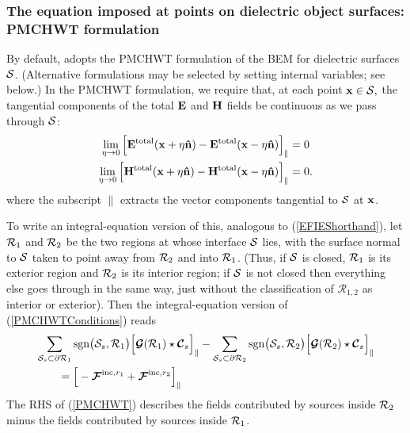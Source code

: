\subsubsection{The equation imposed at points on 
               dielectric object surfaces: PMCHWT formulation}

By default, \lss adopts the PMCHWT formulation of the 
BEM for dielectric surfaces $\mathcal{S}$. 
(Alternative formulations may be selected by setting
internal \lss variables; see below.) In the PMCHWT formulation, 
we require that, at each point $\mathbf{x}\in\mathcal{S},$ the 
tangential components of the total $\mathbf{E}$ and $\mathbf{H}$ 
fields be continuous as we pass through $\mathcal{S}$:
\begin{subequations}
\begin{align}
 \lim_{\eta \to 0}
 \Big[ \mathbf{E}^{\hbox{\scriptsize{total}}}(\mathbf{x} + \eta\mathbf{\hat n})
      -\mathbf{E}^{\hbox{\scriptsize{total}}}(\mathbf{x} - \eta\mathbf{\hat n})
 \Big]_{\parallel} 
&= 0 
\\
 \lim_{\eta \to 0}
 \Big[ \mathbf{H}^{\hbox{\scriptsize{total}}}(\mathbf{x} + \eta\mathbf{\hat n})
      -\mathbf{H}^{\hbox{\scriptsize{total}}}(\mathbf{x} - \eta\mathbf{\hat n})
 \Big]_{\parallel} 
&= 0.
\label{PMCHWTConditions}
\end{align}
\end{subequations}
where the subscript ${\parallel}$ extracts the 
vector components tangential to $\mathcal{S}$ at $\mathbf{x}$.

To write an integral-equation version of this, analogous to
(\ref{EFIEShorthand}), let $\mathcal{R}_1$ and $\mathcal{R}_2$ be
the two regions at whose interface $\mathcal{S}$ lies, with 
the surface normal to $\mathcal{S}$ taken to point away from
$\mathcal{R}_2$ and into $\mathcal{R}_1$. (Thus, if $\mathcal{S}$ is closed,
$\mathcal{R}_1$ is its exterior region and $\mathcal{R}_2$ is its
interior region; if $\mathcal{S}$ is not closed then everything
else goes through in the same way, just without the 
classification of $\mathcal{R}_{1,2}$ as interior or
exterior). Then the integral-equation version of 
(\ref{PMCHWTConditions}) reads
\begin{align}
& \sum_{\mathcal{S}_s \subset \partial \mathcal{R}_1}
   \text{sgn}\big(\mathcal{S}_s,\mathcal{R}_1\big)
   \Big[ \boldsymbol{\mathcal{G}}(\mathcal{R}_1) \star \boldsymbol{\mathcal{C}}_s\Big]_{\parallel}
 -\sum_{\mathcal{S}_s \subset \partial \mathcal{R}_2} 
   \text{sgn}\big(\mathcal{S}_s,\mathcal{R}_2\big)
   \Big[ \boldsymbol{\mathcal{G}}(\mathcal{R}_2) \star \boldsymbol{\mathcal{C}}_s\Big]_{\parallel}
\nonumber \\
&\qquad
=
  \Big[-\boldsymbol{\mathcal{F}}^{\text{\scriptsize inc},r_1} + \boldsymbol{\mathcal{F}}^{\text{\scriptsize inc},r_2} \Big]_{\parallel}
\label{PMCHWT}
\end{align}
The RHS of (\ref{PMCHWT}) describes the fields contributed
by sources inside $\mathcal{R}_2$ minus the fields contributed by 
sources inside $\mathcal{R}_1$.


